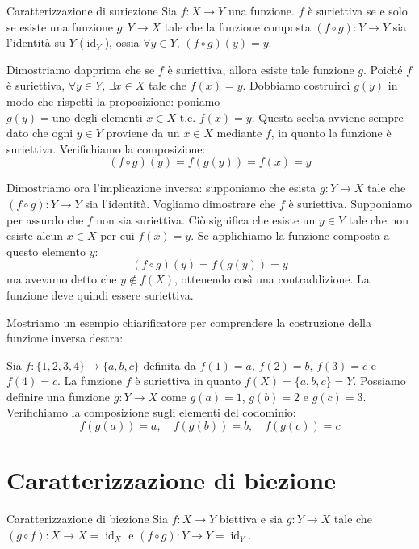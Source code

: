 \documentclass[12pt]{report}
\begin{document}
	\begin{teorema}{Caratterizzazione di suriezione}{}
		Sia $f: X \to Y$ una funzione. $f$ è suriettiva se e solo se esiste una funzione $g: Y \to X$ tale che la funzione composta $(f \circ g): Y \to Y$ sia l'identità su $Y$ ($\operatorname{id}_Y$), ossia $\forall y \in Y, \, (f \circ g)(y) = y$.
	\end{teorema}
	
	\begin{dimostrazione}{}{}
		Dimostriamo dapprima che se $f$ è suriettiva, allora esiste tale funzione $g$. Poiché $f$ è suriettiva, $\forall y \in Y, \, \exists x \in X$ tale che $f(x) = y$. Dobbiamo costruirci $g(y)$ in modo che rispetti la proposizione: poniamo $g(y) = \text{uno degli elementi } x \in X \text{ t.c. } f(x) = y$. Questa scelta avviene sempre dato che ogni $y \in Y$ proviene da un $x \in X$ mediante $f$, in quanto la funzione è suriettiva.
		Verifichiamo la composizione:
		\[
		(f \circ g)(y) = f(g(y)) = f(x) = y
		\]
		
		Dimostriamo ora l'implicazione inversa: supponiamo che esista $g: Y \to X$ tale che $(f \circ g): Y \to Y$ sia l'identità. Vogliamo dimostrare che $f$ è suriettiva.
		Supponiamo per assurdo che $f$ non sia suriettiva. Ciò significa che esiste un $y \in Y$ tale che non esiste alcun $x \in X$ per cui $f(x) = y$.
		Se applichiamo la funzione composta a questo elemento $y$:
		\[
		(f \circ g)(y) = f(g(y)) = y
		\]
		ma avevamo detto che $y \notin f(X)$, ottenendo così una contraddizione. La funzione deve quindi essere suriettiva.
	\end{dimostrazione}
	
	Mostriamo un esempio chiarificatore per comprendere la costruzione della funzione inversa destra:
	
	Sia $f: \{1, 2, 3, 4\} \to \{a, b, c\}$ definita da $f(1) = a$, $f(2) = b$, $f(3) = c$ e $f(4) = c$.
	La funzione $f$ è suriettiva in quanto $f(X) = \{a, b, c\} = Y$.
	Possiamo definire una funzione $g: Y \to X$ come $g(a) = 1$, $g(b) = 2$ e $g(c) = 3$.
	Verifichiamo la composizione sugli elementi del codominio:
	\[
	f(g(a)) = a, \quad f(g(b)) = b, \quad f(g(c)) = c
	\]
	
	\section{Caratterizzazione di biezione}
	
	\begin{teorema}{Caratterizzazione di biezione}{}
		Sia $f: X \to Y$ biettiva e sia $g: Y \to X$ tale che $(g \circ f): X \to X = \operatorname{id}_X$ e $(f \circ g): Y \to Y = \operatorname{id}_Y$.
	\end{teorema}
	
\end{document}
